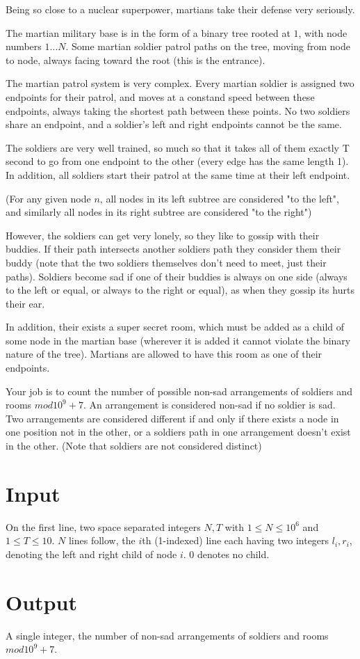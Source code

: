 
Being so close to a nuclear superpower, martians take their defense very seriously.

The martian military base is in the form of a binary tree rooted at $1$, with node numbers $1 \dots N$. Some martian soldier patrol paths on the tree, moving from node to node, always facing toward the root (this is the entrance). 

The martian patrol system is very complex. Every martian soldier is assigned two endpoints for their patrol, and moves at a constand speed between these endpoints, always taking the shortest path between these points. No two soldiers share an endpoint, and a soldier's left and right endpoints cannot be the same.

The soldiers are very well trained, so much so that it takes all of them exactly T second to go from one endpoint to the other (every edge has the same length 1). In addition, all soldiers start their patrol at the same time at their left endpoint.

(For any given node $n$, all nodes in its left subtree are considered "to the left", and similarly all nodes in its right subtree are considered "to the right")

However, the soldiers can get very lonely, so they like to gossip with their buddies. If their path intersects another soldiers path they consider them their buddy (note that the two soldiers themselves don't need to meet, just their paths). Soldiers become sad if one of their buddies is always on one side (always to the left or equal, or always to the right or equal), as when they gossip its hurts their ear.

In addition, their exists a super secret room, which must be added as a child of some node in the martian base (wherever it is added it cannot violate the binary nature of the tree). Martians are allowed to have this room as one of their endpoints.

Your job is to count the number of possible non-sad arrangements of soldiers and rooms $mod 10^9 + 7$. An arrangement is considered non-sad if no soldier is sad. Two arrangements are considered different if and only if there exists a node in one position not in the other, or a soldiers path in one arrangement doesn't exist in the other. (Note that soldiers are not considered distinct)

\section*{Input}
On the first line, two space separated integers $N, T$ with $1 \leq N \leq 10^6$ and $1 \leq T \leq 10$.
$N$ lines follow, the $i$th (1-indexed) line each having two integers $l_i, r_i$, denoting the left and right child of node $i$. $0$ denotes no child.

\section*{Output}
A single integer, the number of non-sad arrangements of soldiers and rooms $mod 10^9 + 7$.
